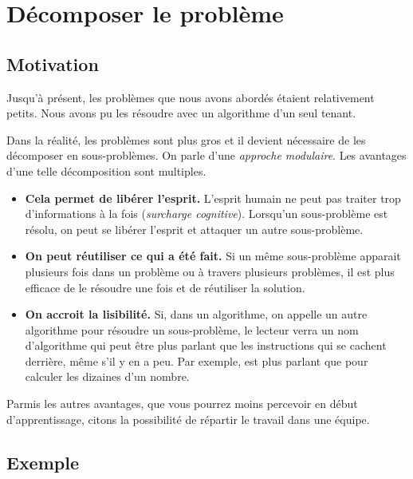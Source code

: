 \chapter{Décomposer le problème}

\section{Motivation}

	Jusqu'à présent, 
	les problèmes que nous avons abordés étaient relativement petits.
	Nous avons pu les résoudre avec un algorithme d'un seul tenant.
	
	Dans la réalité,
	les problèmes sont plus gros 
	et il devient nécessaire de les décomposer en sous-problèmes.
	On parle d'une \emph{approche modulaire}.
	Les avantages d'une telle décomposition sont multiples.
	\begin{itemize}
	\item
		\textbf{Cela permet de libérer l'esprit.}
		L'esprit humain ne peut pas traiter trop d'informations à la fois
		(\emph{surcharge cognitive}).
		Lorsqu'un sous-problème est résolu,
		on peut se libérer l'esprit et attaquer un autre sous-problème.
	\item
		\textbf{On peut réutiliser ce qui a été fait.}
		Si un même sous-problème apparait plusieurs fois
		dans un problème ou à travers plusieurs problèmes,
		il est plus efficace de le résoudre une fois et
		de réutiliser la solution.
	\item
		\textbf{On accroit la lisibilité.}
		Si, dans un algorithme, 
		on appelle un autre algorithme pour résoudre un sous-problème,
		le lecteur verra un nom d'algorithme qui peut être plus parlant
		que les instructions qui se cachent derrière, même s'il y en a peu.
		Par exemple,  est plus parlant que
		 pour calculer les dizaines d'un nombre.
	\end{itemize}

	Parmis les autres avantages, 
	que vous pourrez moins percevoir en début d'apprentissage,
	citons la possibilité de répartir le travail dans une équipe.
	
\section{Exemple}

